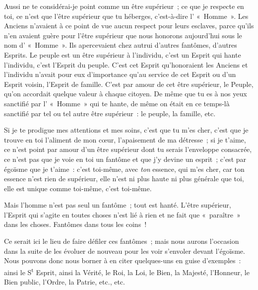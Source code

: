 \documentclass[french,twoside]{book} %
\def\mednobreak{\ifdim\lastskip<\medskipamount
  \removelastskip\nopagebreak\medskip\fi}
\newcommand{\labelblock}[1]{\medbreak{\noindent\color{rubric}\bfseries #1}\par\mednobreak}
\begin{document}
Aussi ne te considérai-je point comme un être supérieur ; ce que je respecte en toi, ce n’est que l’être  supérieur que tu héberges, c’est-à-dire l’ « Homme ». Les Anciens n’avaient à ce point de vue aucun respect pour leurs esclaves, parce qu’ils n’en avaient guère pour l’être supérieur que nous honorons aujourd’hui sous le nom d’ « Homme ». Ils apercevaient chez autrui d’autres fantômes, d’autres Esprits. Le peuple est un être supérieur à l’individu, c’est un Esprit qui hante l’individu, c’est l’Esprit du peuple. C’est cet Esprit qu’honoraient les Anciens et l’individu n’avait pour eux d’importance qu’au service de cet Esprit ou d’un Esprit voisin, l’Esprit de famille. C’est par amour de cet être supérieur, le Peuple, qu’on accordait quelque valeur à chaque citoyen. De même que tu es à nos yeux sanctifié par l’ « Homme » qui te hante, de même on était en ce temps-là sanctifié par tel ou tel autre être supérieur : le peuple, la famille, etc.\par
Si je te prodigue mes attentions et mes soins, c’est que tu m’es cher, c’est que je trouve en toi l’aliment de mon cœur, l’apaisement de ma détresse ; si je t’aime, ce n’est point par amour d’un être supérieur dont tu serais l’enveloppe consacrée, ce n’est pas que je voie en toi un fantôme et que j’y devine un esprit ; c’est par égoïsme que je t’aime : c’est toi-même, avec \emph{ton} essence, qui m’es cher, car ton essence n’est rien de supérieur, elle n’est ni plus haute ni plus générale que toi, elle est unique comme toi-même, c’est toi-même.\par
Mais l’homme n’est pas seul un fantôme ; tout est hanté. L’être supérieur, l’Esprit qui s’agite en toutes choses n’est lié à rien et ne fait que « paraître » dans les choses. Fantômes dans tous les coins !\par
Ce serait ici le lieu de faire défiler ces fantômes ; mais nous aurons l’occasion dans la suite de les évoluer de nouveau pour les voir s’envoler devant l’égoïsme. Nous pouvons donc nous borner à en citer quelques-uns en guise d’exemples : ainsi le S\textsuperscript{t} Esprit, ainsi la Vérité, le Roi, la Loi, le Bien, la  Majesté, l’Honneur, le Bien public, l’Ordre, la Patrie, etc., etc.\par

\labelblock{La Marotte.}
\end{document}
